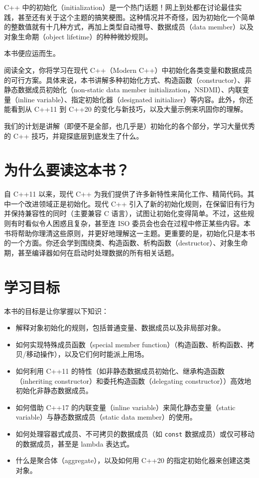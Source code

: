 C++ 中的初始化（initialization）是一个热门话题！网上到处都在讨论最佳实践，甚至还有关于这个主题的搞笑梗图。这种情况并不奇怪，因为初始化一个简单的整数值就有十几种方式，再加上类型自动推导、数据成员（data member）以及对象生命期（object lifetime）的种种微妙规则。

本书便应运而生。

阅读全文，你将学习在现代 C++（Modern C++）中初始化各类变量和数据成员的可行方案。具体来说，本书讲解多种初始化方式、构造函数（constructor）、非静态数据成员初始化（non-static data member initialization，NSDMI）、内联变量（inline variable）、指定初始化器（designated initializer）等内容。此外，你还能看到从 C++11 到 C++20 的变化与新技巧，以及大量示例来巩固你的理解。

我们的计划是讲解（即便不是全部，也几乎是）初始化的各个部分，学习大量优秀的 C++ 技巧，并窥探底层到底发生了什么。

\section{为什么要读这本书？}

自 C++11 以来，现代 C++ 为我们提供了许多新特性来简化工作、精简代码。其中一个改进领域正是初始化。现代 C++ 引入了新的初始化规则，在保留旧有行为并保持兼容性的同时（主要兼容 C 语言），试图让初始化变得简单。不过，这些规则有时看似令人困惑且复杂，甚至连 ISO 委员会也会在过程中修正某些内容。本书将帮助你理清这些原则，并更好地理解这一主题。更重要的是，初始化只是本书的一个方面。你还会学到围绕类、构造函数、析构函数（destructor）、对象生命期，甚至编译器如何在启动时处理数据的所有相关话题。

\section{学习目标}

本书的目标是让你掌握以下知识：

\begin{itemize}
\item 解释对象初始化的规则，包括普通变量、数据成员以及非局部对象。
\item 如何实现特殊成员函数（special member function）（构造函数、析构函数、拷贝/移动操作），以及它们何时能派上用场。
\item 如何利用 C++11 的特性（如非静态数据成员初始化、继承构造函数（inheriting constructor）和委托构造函数（delegating constructor））高效地初始化非静态数据成员。
\item 如何借助 C++17 的内联变量（inline variable）来简化静态变量（static variable）与静态数据成员（static data member）的使用。
\item 如何处理容器式成员、不可拷贝的数据成员（如 \texttt{const} 数据成员）或仅可移动的数据成员，甚至是 lambda 表达式。
\item 什么是聚合体（aggregate），以及如何用 C++20 的指定初始化器来创建这类对象。
\end{itemize}

